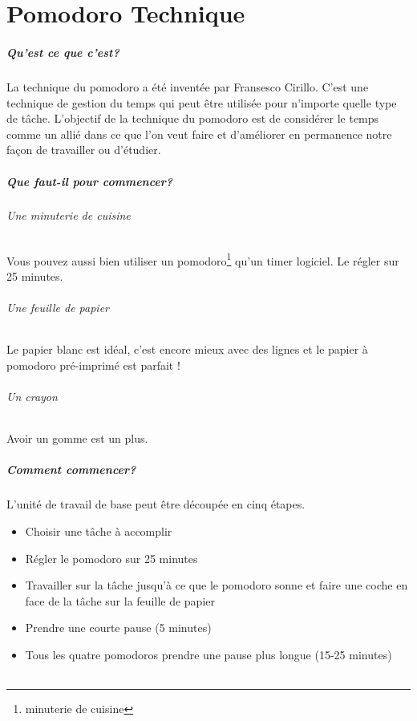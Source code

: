 \chapter{Pomodoro Technique}\label{annexe:pomodoro}

\paragraph*{Qu'est ce que c'est?}La technique du pomodoro a été inventée par Fransesco Cirillo. C'est une technique de gestion du temps qui peut être utilisée pour n'importe quelle type de tâche. L'objectif de la technique du pomodoro est de considérer le temps comme un allié dans ce que l'on veut faire et d'améliorer en permanence notre façon de travailler ou d'étudier.

\paragraph*{Que faut-il pour commencer?}
\subparagraph*{Une minuterie de cuisine}
Vous pouvez aussi bien utiliser un pomodoro\footnote{minuterie de cuisine} qu'un timer logiciel. Le régler sur 25 minutes.

\subparagraph*{Une feuille de papier}
Le papier blanc est idéal, c'est encore mieux avec des lignes et le papier à pomodoro pré-imprimé est parfait !

\subparagraph*{Un crayon}
Avoir un gomme est un plus.

\paragraph*{Comment commencer?}
L'unité de travail de base peut être découpée en cinq étapes.
\begin{itemize}
\item{Choisir une tâche à accomplir}
\item{Régler le pomodoro sur 25 minutes}
\item{Travailler sur la tâche jusqu'à ce que le pomodoro sonne et faire une coche en face de la tâche sur la feuille de papier}
\item{Prendre une courte pause (5 minutes)}
\item{Tous les quatre pomodoros prendre une pause plus longue (15-25 minutes)}
\end{itemize}

\subparagraph*{}

 